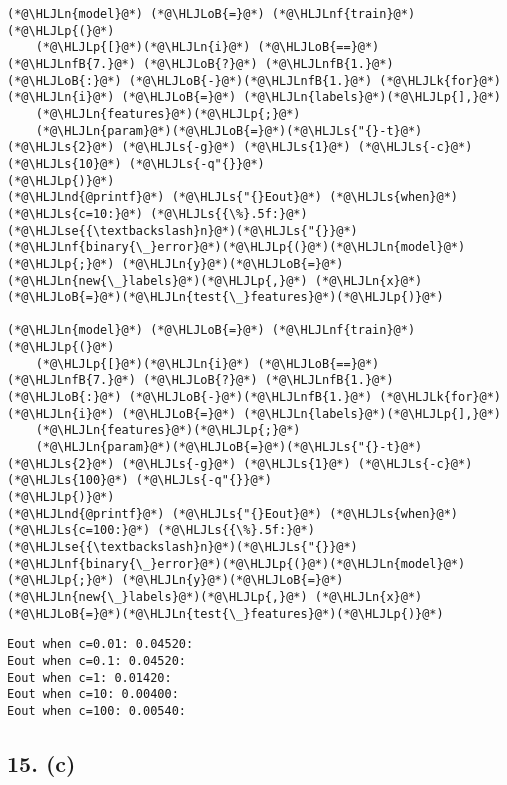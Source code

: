 \documentclass[12pt,a4paper]{article}
\newcommand{\HLJLk}[1]{\textcolor[RGB]{148,91,176}{\textbf{#1}}}
\newcommand{\HLJLn}[1]{#1}
\newcommand{\HLJLnd}[1]{\textcolor[RGB]{214,102,97}{#1}}
\newcommand{\HLJLnf}[1]{\textcolor[RGB]{66,102,213}{#1}}
\newcommand{\HLJLs}[1]{\textcolor[RGB]{201,61,57}{#1}}
\newcommand{\HLJLse}[1]{\textcolor[RGB]{59,151,46}{#1}}
\newcommand{\HLJLnfB}[1]{\textcolor[RGB]{59,151,46}{#1}}
\newcommand{\HLJLoB}[1]{\textcolor[RGB]{102,102,102}{\textbf{#1}}}
\newcommand{\HLJLp}[1]{#1}
\begin{document}
\begin{lstlisting}
(*@\HLJLn{model}@*) (*@\HLJLoB{=}@*) (*@\HLJLnf{train}@*)(*@\HLJLp{(}@*)
    (*@\HLJLp{[}@*)(*@\HLJLn{i}@*) (*@\HLJLoB{==}@*) (*@\HLJLnfB{7.}@*) (*@\HLJLoB{?}@*) (*@\HLJLnfB{1.}@*) (*@\HLJLoB{:}@*) (*@\HLJLoB{-}@*)(*@\HLJLnfB{1.}@*) (*@\HLJLk{for}@*) (*@\HLJLn{i}@*) (*@\HLJLoB{=}@*) (*@\HLJLn{labels}@*)(*@\HLJLp{],}@*) 
    (*@\HLJLn{features}@*)(*@\HLJLp{;}@*) 
    (*@\HLJLn{param}@*)(*@\HLJLoB{=}@*)(*@\HLJLs{"{}-t}@*) (*@\HLJLs{2}@*) (*@\HLJLs{-g}@*) (*@\HLJLs{1}@*) (*@\HLJLs{-c}@*) (*@\HLJLs{10}@*) (*@\HLJLs{-q"{}}@*)
(*@\HLJLp{)}@*)
(*@\HLJLnd{@printf}@*) (*@\HLJLs{"{}Eout}@*) (*@\HLJLs{when}@*) (*@\HLJLs{c=10:}@*) (*@\HLJLs{{\%}.5f:}@*)(*@\HLJLse{{\textbackslash}n}@*)(*@\HLJLs{"{}}@*) (*@\HLJLnf{binary{\_}error}@*)(*@\HLJLp{(}@*)(*@\HLJLn{model}@*)(*@\HLJLp{;}@*) (*@\HLJLn{y}@*)(*@\HLJLoB{=}@*)(*@\HLJLn{new{\_}labels}@*)(*@\HLJLp{,}@*) (*@\HLJLn{x}@*)(*@\HLJLoB{=}@*)(*@\HLJLn{test{\_}features}@*)(*@\HLJLp{)}@*)

(*@\HLJLn{model}@*) (*@\HLJLoB{=}@*) (*@\HLJLnf{train}@*)(*@\HLJLp{(}@*)
    (*@\HLJLp{[}@*)(*@\HLJLn{i}@*) (*@\HLJLoB{==}@*) (*@\HLJLnfB{7.}@*) (*@\HLJLoB{?}@*) (*@\HLJLnfB{1.}@*) (*@\HLJLoB{:}@*) (*@\HLJLoB{-}@*)(*@\HLJLnfB{1.}@*) (*@\HLJLk{for}@*) (*@\HLJLn{i}@*) (*@\HLJLoB{=}@*) (*@\HLJLn{labels}@*)(*@\HLJLp{],}@*) 
    (*@\HLJLn{features}@*)(*@\HLJLp{;}@*) 
    (*@\HLJLn{param}@*)(*@\HLJLoB{=}@*)(*@\HLJLs{"{}-t}@*) (*@\HLJLs{2}@*) (*@\HLJLs{-g}@*) (*@\HLJLs{1}@*) (*@\HLJLs{-c}@*) (*@\HLJLs{100}@*) (*@\HLJLs{-q"{}}@*)
(*@\HLJLp{)}@*)
(*@\HLJLnd{@printf}@*) (*@\HLJLs{"{}Eout}@*) (*@\HLJLs{when}@*) (*@\HLJLs{c=100:}@*) (*@\HLJLs{{\%}.5f:}@*)(*@\HLJLse{{\textbackslash}n}@*)(*@\HLJLs{"{}}@*) (*@\HLJLnf{binary{\_}error}@*)(*@\HLJLp{(}@*)(*@\HLJLn{model}@*)(*@\HLJLp{;}@*) (*@\HLJLn{y}@*)(*@\HLJLoB{=}@*)(*@\HLJLn{new{\_}labels}@*)(*@\HLJLp{,}@*) (*@\HLJLn{x}@*)(*@\HLJLoB{=}@*)(*@\HLJLn{test{\_}features}@*)(*@\HLJLp{)}@*)
\end{lstlisting}

\begin{lstlisting}
Eout when c=0.01: 0.04520:
Eout when c=0.1: 0.04520:
Eout when c=1: 0.01420:
Eout when c=10: 0.00400:
Eout when c=100: 0.00540:
\end{lstlisting}


\subsection{15. (c)}
\end{document}
